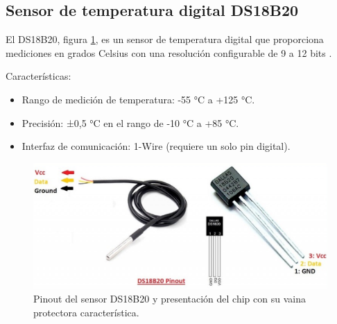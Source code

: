 \subsection{Sensor de temperatura digital DS18B20}

El DS18B20, figura \ref{fig:ds18b20}, es un sensor de temperatura digital que proporciona mediciones en grados Celsius con una resolución configurable de 9 a 12 bits \cite{DS18B20}. %

Características:

\begin{itemize}
	\item Rango de medición de temperatura: -55 °C a +125 °C.
	\item Precisión: ±0,5 °C en el rango de -10 °C a +85 °C.
	\item Interfaz de comunicación: 1-Wire (requiere un solo pin digital).
\end{itemize}


\begin{figure}[h]
\centering
\includegraphics[scale=.5]{./Figures/ds18b20.png}
	\caption{Pinout del sensor DS18B20 y presentación del chip con su vaina protectora característica\protect\footnotemark.}
	\label{fig:ds18b20}
\end{figure}


